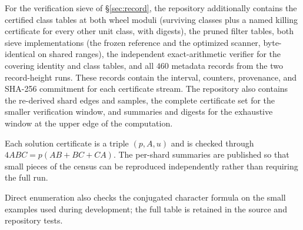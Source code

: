 \documentclass[11pt]{article}
\theoremstyle{definition}
\theoremstyle{remark}
\begin{document}
For the verification sieve of \S\ref{sec:record}, the repository additionally contains
the certified class tables at both wheel moduli (surviving classes plus a named
killing certificate for every other unit class, with digests), the pruned filter
tables, both sieve implementations (the frozen reference and the optimized scanner,
byte-identical on shared ranges), the independent exact-arithmetic verifier for the
covering identity and class tables, and all $460$ metadata records from the two
record-height runs. These records contain the interval, counters, provenance, and
SHA-256 commitment for each certificate stream. The repository also contains the
re-derived shard edges and samples, the complete certificate set for the smaller
verification window, and summaries and digests for the exhaustive window at the upper
edge of the computation.

Each solution certificate is a triple $(p,A,u)$ and is checked through
$4ABC=p(AB+BC+CA)$. The per-shard summaries are published so that small pieces of the
census can be reproduced independently rather than requiring the full run.

Direct enumeration also checks the conjugated character formula on the small examples
used during development; the full table is retained in the source and repository tests.

\end{document}
